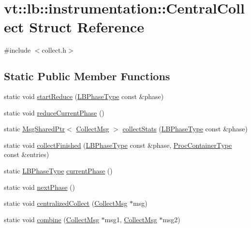 \hypertarget{structvt_1_1lb_1_1instrumentation_1_1_central_collect}{}\section{vt\+:\+:lb\+:\+:instrumentation\+:\+:Central\+Collect Struct Reference}
\label{structvt_1_1lb_1_1instrumentation_1_1_central_collect}


{\ttfamily \#include $<$collect.\+h$>$}

\subsection*{Static Public Member Functions}
\begin{DoxyCompactItemize}
\item 
static void \hyperlink{structvt_1_1lb_1_1instrumentation_1_1_central_collect_a1b5d16c13976ea4c6db0275ef3ff35d8}{start\+Reduce} (\hyperlink{namespacevt_a5505d0bab25ce2ff566a8e015871b379}{L\+B\+Phase\+Type} const \&phase)
\item 
static void \hyperlink{structvt_1_1lb_1_1instrumentation_1_1_central_collect_adc3e069b48fdd2031d23cbfa66885537}{reduce\+Current\+Phase} ()
\item 
static \hyperlink{namespacevt_ab2b3d506ec8e8d1540aede826d84a239}{Msg\+Shared\+Ptr}$<$ \hyperlink{structvt_1_1lb_1_1instrumentation_1_1_collect_msg}{Collect\+Msg} $>$ \hyperlink{structvt_1_1lb_1_1instrumentation_1_1_central_collect_a7161d3f662ad33336ff3dfacfb141e45}{collect\+Stats} (\hyperlink{namespacevt_a5505d0bab25ce2ff566a8e015871b379}{L\+B\+Phase\+Type} const \&phase)
\item 
static void \hyperlink{structvt_1_1lb_1_1instrumentation_1_1_central_collect_a3b41c4af5113e069d87d5d10e3c7ae59}{collect\+Finished} (\hyperlink{namespacevt_a5505d0bab25ce2ff566a8e015871b379}{L\+B\+Phase\+Type} const \&phase, \hyperlink{namespacevt_1_1lb_af7c6ee21a7b3966b7ab64c5b626d30f8}{Proc\+Container\+Type} const \&entries)
\item 
static \hyperlink{namespacevt_a5505d0bab25ce2ff566a8e015871b379}{L\+B\+Phase\+Type} \hyperlink{structvt_1_1lb_1_1instrumentation_1_1_central_collect_ae9561fb73a1aa198c1b69941870b8a6a}{current\+Phase} ()
\item 
static void \hyperlink{structvt_1_1lb_1_1instrumentation_1_1_central_collect_aa0cc1c988760bbb5d6f1fd008e827777}{next\+Phase} ()
\item 
static void \hyperlink{structvt_1_1lb_1_1instrumentation_1_1_central_collect_a08855053af75446a7bc080592126bb1a}{centralized\+Collect} (\hyperlink{structvt_1_1lb_1_1instrumentation_1_1_collect_msg}{Collect\+Msg} $\ast$msg)
\item 
static void \hyperlink{structvt_1_1lb_1_1instrumentation_1_1_central_collect_a38b6e55982754362cbea1921e044038c}{combine} (\hyperlink{structvt_1_1lb_1_1instrumentation_1_1_collect_msg}{Collect\+Msg} $\ast$msg1, \hyperlink{structvt_1_1lb_1_1instrumentation_1_1_collect_msg}{Collect\+Msg} $\ast$msg2)
\end{DoxyCompactItemize}
